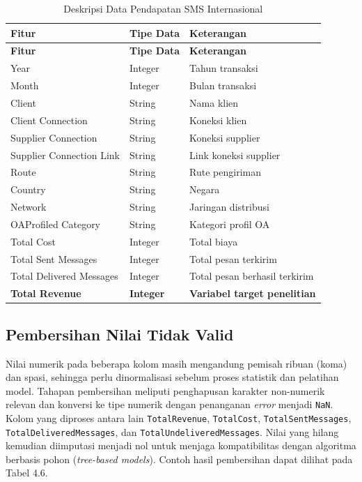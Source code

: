 \begin{longtable}{lll}
    \caption{Deskripsi Data Pendapatan SMS Internasional} \\
    \toprule
    \textbf{Fitur} & \textbf{Tipe Data} & \textbf{Keterangan} \\
    \midrule
    \endfirsthead
    
    \toprule
    \textbf{Fitur} & \textbf{Tipe Data} & \textbf{Keterangan} \\
    \midrule
    \endhead
    
    Year & Integer & Tahun transaksi \\
    Month & Integer & Bulan transaksi \\
    Client & String & Nama klien \\
    Client Connection & String & Koneksi klien \\
    Supplier Connection & String & Koneksi supplier \\
    Supplier Connection Link & String & Link koneksi supplier \\
    Route & String & Rute pengiriman \\
    Country & String & Negara \\
    Network & String & Jaringan distribusi \\
    OAProfiled Category & String & Kategori profil OA \\
    Total Cost & Integer & Total biaya \\
    Total Sent Messages & Integer & Total pesan terkirim \\
    Total Delivered Messages & Integer & Total pesan berhasil terkirim \\
    \textbf{Total Revenue} & \textbf{Integer} & \textbf{Variabel target penelitian} \\
    \bottomrule
    \end{longtable}
    
\subsection{Pembersihan Nilai Tidak Valid}
Nilai numerik pada beberapa kolom masih mengandung pemisah ribuan (koma) dan spasi, sehingga perlu dinormalisasi sebelum proses statistik dan pelatihan model. Tahapan pembersihan meliputi penghapusan karakter non-numerik relevan dan konversi ke tipe numerik dengan penanganan \textit{error} menjadi \texttt{NaN}. Kolom yang diproses antara lain \texttt{TotalRevenue}, \texttt{TotalCost}, \texttt{TotalSentMessages}, \texttt{TotalDeliveredMessages}, dan \texttt{TotalUndeliveredMessages}. Nilai yang hilang kemudian diimputasi menjadi nol untuk menjaga kompatibilitas dengan algoritma berbasis pohon (\textit{tree-based models}). Contoh hasil pembersihan dapat dilihat pada Tabel 4.6.

